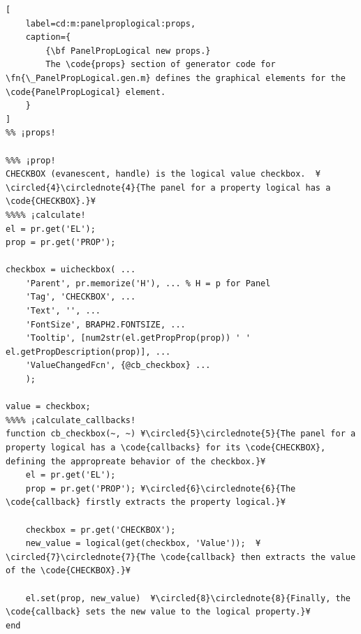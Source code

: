 \documentclass{tufte-handout}
\begin{document}
\begin{lstlisting}[
	label=cd:m:panelproplogical:props,
	caption={
		{\bf PanelPropLogical new props.}
		The \code{props} section of generator code for \fn{\_PanelPropLogical.gen.m} defines the graphical elements for the \code{PanelPropLogical} element.
	}
]
%% ¡props!

%%% ¡prop!
CHECKBOX (evanescent, handle) is the logical value checkbox.  ¥\circled{4}\circlednote{4}{The panel for a property logical has a \code{CHECKBOX}.}¥
%%%% ¡calculate!
el = pr.get('EL');
prop = pr.get('PROP');

checkbox = uicheckbox( ...
    'Parent', pr.memorize('H'), ... % H = p for Panel
    'Tag', 'CHECKBOX', ...
    'Text', '', ...
    'FontSize', BRAPH2.FONTSIZE, ...
    'Tooltip', [num2str(el.getPropProp(prop)) ' ' el.getPropDescription(prop)], ...
    'ValueChangedFcn', {@cb_checkbox} ...
    );

value = checkbox;
%%%% ¡calculate_callbacks!
function cb_checkbox(~, ~) ¥\circled{5}\circlednote{5}{The panel for a property logical has a \code{callbacks} for its \code{CHECKBOX}, defining the appropreate behavior of the checkbox.}¥
    el = pr.get('EL');
    prop = pr.get('PROP'); ¥\circled{6}\circlednote{6}{The \code{callback} firstly extracts the property logical.}¥
    
    checkbox = pr.get('CHECKBOX');
    new_value = logical(get(checkbox, 'Value'));  ¥\circled{7}\circlednote{7}{The \code{callback} then extracts the value of the \code{CHECKBOX}.}¥
    
    el.set(prop, new_value)  ¥\circled{8}\circlednote{8}{Finally, the \code{callback} sets the new value to the logical property.}¥
end

\end{lstlisting}
\end{document}

